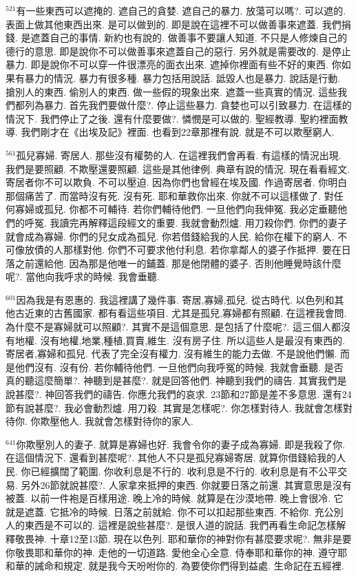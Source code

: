 \documentclass{book}
\begin{document}
$^{521}$有一些東西可以遮掩的.
遮自己的貪婪.
遮自己的暴力.
放蕩可以嗎?.
可以遮的.
表面上做其他東西出來.
是可以做到的.
即是說在這裡不可以做善事來遮蓋.
我們捐錢.
是遮蓋自己的事情.
新約也有說的.
做善事不要讓人知道.
不只是人修煉自己的德行的意思.
即是說你不可以做善事來遮蓋自己的惡行.
另外就是需要改的.
是停止暴力.
即是說你不可以穿一件很漂亮的面衣出來.
遮掉你裡面有些不好的東西.
你如果有暴力的情況.
暴力有很多種.
暴力包括用說話.
詆毀人也是暴力.
說話是行動.
搶別人的東西.
偷別人的東西.
做一些假的現象出來.
遮蓋一些真實的情況.
這些我們都列為暴力.
首先我們要做什麼?.
停止這些暴力.
貪婪也可以引致暴力.
在這樣的情況下.
我們停止了之後.
還有什麼要做?.
憐憫是可以做的.
聖經教導.
聖約裡面教導.
我們剛才在《出埃及記》裡面.
也看到22章那裡有說.
就是不可以欺壓窮人.

$^{561}$孤兒寡婦.
寄居人.
那些沒有權勢的人.
在這裡我們會再看.
有這樣的情況出現.
我們是要照顧.
不欺壓還要照顧.
這些是其他律例.
典章有說的情況.
現在看看經文.
寄居者你不可以欺負.
不可以壓迫.
因為你們也曾經在埃及國.
作過寄居者.
你明白那個痛苦了.
而當時沒有死.
沒有死.
耶和華救你出來.
你就不可以這樣做了.
對任何寡婦或孤兒.
你都不可輔待.
若你們輔待他們.
一旦他們向我伸冤.
我必定垂聽他們的呼冤.
我讀完再解釋這段經文的重要.
我就會動烈爐.
用刀殺你們.
你們的妻子就會成為寡婦.
你們的兒女成為孤兒.
你若借錢給我的人民.
給你在權下的窮人.
不可像放債的人那樣對他.
你們不可要求他付利息.
若你拿鄰人的婆子作抵押.
要在日落之前還給他.
因為那是他唯一的鋪蓋.
那是他閉體的婆子.
否則他睡覺時該什麼呢?.
當他向我呼求的時候.
我會垂聽.

$^{601}$因為我是有恩惠的.
我這裡講了幾件事.
寄居,寡婦,孤兒.
從古時代.
以色列和其他古近東的古舊國家.
都有看這些項目.
尤其是孤兒,寡婦都有照顧.
在這裡我會問.
為什麼不是寡婦就可以照顧?.
其實不是這個意思.
是包括了什麼呢?.
這三個人都沒有地權.
沒有地權,地業,種植,買賣,維生.
沒有房子住.
所以這些人是最沒有東西的.
寄居者,寡婦和孤兒.
代表了完全沒有權力.
沒有維生的能力去做.
不是說他們懶.
而是他們沒有.
沒有份.
若你輔待他們.
一旦他們向我呼冤的時候.
我就會垂聽.
是否真的聽這麼簡單?.
神聽到是甚麼?.
就是回答他們.
神聽到我們的禱告.
其實我們是說甚麼?.
神回答我們的禱告.
你應允我們的哀求.
23節和27節是差不多意思.
還有24節有說甚麼?.
我必會動烈爐.
用刀殺.
其實是怎樣呢?.
你怎樣對待人.
我就會怎樣對待你.
你欺壓他人.
我就會怎樣對待你的家人.

$^{641}$你欺壓別人的妻子.
就算是寡婦也好.
我會令你的妻子成為寡婦.
即是我殺了你.
在這個情況下.
還看到甚麼呢?.
其他人不只是孤兒寡婦寄居.
就算你借錢給我的人民.
你已經擴闊了範圍.
你收利息是不行的.
收利息是不行的.
收利息是有不公平交易.
另外26節就說甚麼?.
人家拿來抵押的東西.
你就要日落之前還.
其實意思是沒有被蓋.
以前一件袍是百樣用途.
晚上冷的時候.
就算是在沙漠地帶.
晚上會很冷.
它就是遮蓋.
它抵冷的時候.
日落之前就給.
你不可以扣起那些東西.
不給你.
充公別人的東西是不可以的.
這裡是說些甚麼?.
是很人道的說話.
我們再看生命記怎樣解釋敬畏神.
十章12至13節.
現在以色列.
耶和華你的神對你有甚麼要求呢?.
無非是要你敬畏耶和華你的神.
走他的一切道路.
愛他全心全意.
侍奉耶和華你的神.
遵守耶和華的誡命和規定.
就是我今天吩咐你的.
為要使你們得到益處.
生命記在五經裡.
\end{document}
